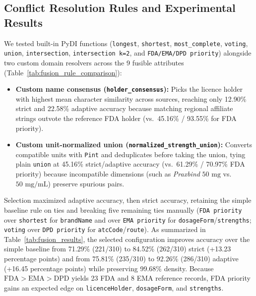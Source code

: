 \documentclass{llncs}
\begin{document}
\subsection{Conflict Resolution Rules and Experimental Results}
We tested built-in PyDI functions (\texttt{longest}, \texttt{shortest}, \texttt{most\_complete}, \texttt{voting}, \texttt{union}, \texttt{intersection}, \texttt{intersection k=2}, and \texttt{FDA/EMA/DPD priority}) alongside two custom domain resolvers across the 9 fusible attributes (Table~\ref{tab:fusion_rule_comparison}):
\begin{itemize}
  \item \textbf{Custom name consensus (\texttt{holder\_consensus}):} Picks the licence holder with highest mean character similarity across sources, reaching only 12.90\% strict and 22.58\% adaptive accuracy because matching regional affiliate strings outvote the reference FDA holder (vs.\ 45.16\% / 93.55\% for FDA priority).
  \item \textbf{Custom unit-normalized union (\texttt{normalized\_strength\_union}):} Converts compatible units with \texttt{Pint} and deduplicates before taking the union, tying plain \texttt{union} at 45.16\% strict/adaptive accuracy (vs.\ 61.29\% / 70.97\% FDA priority) because incompatible dimensions (such as \textit{Praxbind} $50\text{ mg}$ vs.\ $50\text{ mg/mL}$) preserve spurious pairs.
\end{itemize}

Selection maximized adaptive accuracy, then strict accuracy, retaining the simple baseline rule on ties and breaking five remaining ties manually (\texttt{FDA priority} over \texttt{shortest} for \texttt{brandName} and over \texttt{EMA priority} for \texttt{dosageForm}/\texttt{strengths}; \texttt{voting} over \texttt{DPD priority} for \texttt{atcCode}/\texttt{route}). As summarized in Table~\ref{tab:fusion_results}, the selected configuration improves accuracy over the simple baseline from 71.29\% (221/310) to 84.52\% (262/310) strict (+13.23 percentage points) and from 75.81\% (235/310) to 92.26\% (286/310) adaptive (+16.45 percentage points) while preserving 99.68\% density. Because $\text{FDA}>\text{EMA}>\text{DPD}$ yields 23 FDA and 8 EMA reference records, FDA priority gains an expected edge on \texttt{licenceHolder}, \texttt{dosageForm}, and \texttt{strengths}.
\end{document}
